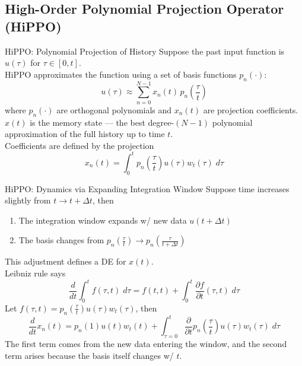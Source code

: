 \documentclass[xcolor=dvipsnames,aspectratio=169]{beamer}
\begin{document}
        \subsection{High-Order Polynomial Projection Operator (HiPPO)}
            \begin{frame}{HiPPO: Polynomial Projection of History}
                Suppose the past input function is $u(\tau)$ for $\tau \in [0, t]$. \\
                HiPPO approximates the function using a set of basis functions $p_{n} (\cdot)$: 
                $$u(\tau) \approx \sum_{n=0}^{N-1} x_n(t) \, p_n (\frac{\tau}{t})$$
                where $p_{n} (\cdot)$ are orthogonal polynomials and $x_{n} (t)$ are projection coefficients. \\
                $x(t)$ is the memory state — the best degree-$(N - 1)$ polynomial approximation of the full history up to time $t$. \\
                Coefficients are defined by the projection 
                $$x_n(t) = \int_0^t p_n (\frac{\tau}{t}) u(\tau) w_t(\tau) \; d\tau $$
            \end{frame}

            \begin{frame}{HiPPO: Dynamics via Expanding Integration Window}
                Suppose time increases slightly from $t \to t + \Delta t$, then
                
                \begin{enumerate}
                    \item The integration window expands w/ new data $u(t + \Delta t)$
                    \item The basis changes from $p_{n} (\frac{\tau}{t}) \to p_{n} (\frac{\tau}{t + \Delta t})$
                \end{enumerate}

                This adjustment defines a DE for $x(t)$. \\
                Leibniz rule says 
                $$\frac{d}{dt} \int_0^t f(\tau,t) \; d\tau = f(t,t) + \int_0^t \frac{\partial f}{\partial t}(\tau,t) \; d\tau$$
                Let $f(\tau, t) = p_n (\frac{\tau}{t}) u(\tau) w_t(\tau)$, then 
                $$\frac{d}{dt} x_{n} (t) = p_{n} (1) u(t) w_{t}(t) + \int_{\tau = 0}^{t} \frac{\partial}{\partial t} p_n (\frac{\tau}{t}) u(\tau) w_t(\tau) \; d\tau$$ 
                The first term comes from the new data entering the window, and the second term arises because the basis itself changes w/ $t$.
            \end{frame}
\end{document}
